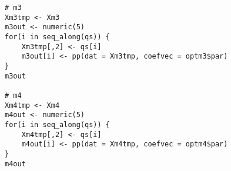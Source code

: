 \documentclass[a4paper,12pt]{article}
\begin{document}
\begin{enumerate}
\begin{solution}
\begin{lstlisting}
# m3
Xm3tmp <- Xm3
m3out <- numeric(5)
for(i in seq_along(qs)) {
    Xm3tmp[,2] <- qs[i]
    m3out[i] <- pp(dat = Xm3tmp, coefvec = optm3$par)
}
m3out

# m4
Xm4tmp <- Xm4
m4out <- numeric(5)
for(i in seq_along(qs)) {
    Xm4tmp[,2] <- qs[i]
    m4out[i] <- pp(dat = Xm4tmp, coefvec = optm4$par)
}
m4out
\end{lstlisting}
\end{solution}


\end{enumerate}
\end{document}
